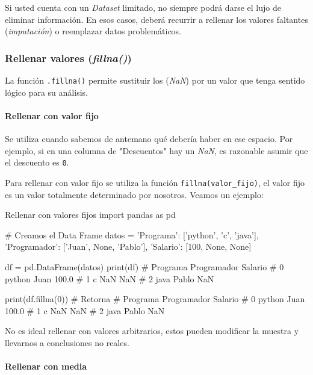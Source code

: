 Si usted cuenta con un \textit{Dataset} limitado, no siempre podrá darse el lujo de eliminar información. En esos casos, deberá recurrir a rellenar los valores faltantes (\textit{imputación}) o reemplazar datos problemáticos.

\subsubsection{Rellenar valores (\textit{fillna()})}

La función \texttt{.fillna()} permite sustituir los (\textit{NaN}) por un valor que tenga sentido lógico para su análisis.

\paragraph{Rellenar con valor fijo}

Se utiliza cuando sabemos de antemano qué debería haber en ese espacio. Por ejemplo, si en una columna de "Descuentos" hay un \textit{NaN}, es razonable asumir que el descuento es \texttt{0}.

Para rellenar con valor fijo se utiliza la función \texttt{fillna(valor\_fijo)}, el valor fijo es un valor totalmente determinado por nosotros. Veamos un ejemplo:
\begin{pycode}{Rellenar con valores fijos}
import pandas as pd

# Creamos el Data Frame
datos = {
    'Programa': ['python', 'c', 'java'],
    'Programador': ['Juan', None, 'Pablo'],
    'Salario': [100, None, None]
}    

df = pd.DataFrame(datos)
print(df)
#   Programa Programador  Salario
# 0   python        Juan    100.0
# 1        c         NaN      NaN
# 2     java       Pablo      NaN

print(df.fillna(0)) # Retorna
#   Programa Programador  Salario
# 0   python        Juan    100.0
# 1        c         NaN      NaN
# 2     java       Pablo      NaN
\end{pycode}

\begin{nota}
    No es ideal rellenar con valores arbitrarios, estos pueden modificar la muestra y llevarnos a conclusiones no reales.
\end{nota}

\paragraph{Rellenar con media}

